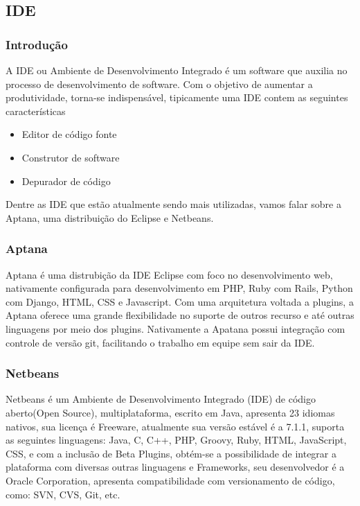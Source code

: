 \documentclass[12pt,a4paper]{article}
\begin{document}
	\subsection{IDE}
	
		\subsubsection{Introdução}

				A IDE ou Ambiente de Desenvolvimento Integrado é um software que auxilia no
				processo de desenvolvimento de software. Com o objetivo de aumentar a
				produtividade, torna-se indispensável, tipicamente uma IDE contem as
				seguintes características
				\begin{itemize}
					\item Editor de código fonte
					\item Construtor de software
					\item Depurador de código
				\end{itemize}
				
				Dentre as IDE que estão atualmente sendo mais utilizadas, vamos falar sobre
				a Aptana, uma distribuição do Eclipse e Netbeans.
		
		\subsubsection{Aptana}
		
			Aptana é uma distrubição da IDE Eclipse com foco no desenvolvimento web, nativamente configurada para
			desenvolvimento em PHP, Ruby com Rails, Python com Django, HTML, CSS e Javascript. Com uma arquitetura voltada a
			plugins, a Aptana oferece uma grande flexibilidade no suporte de outros recurso e até outras linguagens por meio dos
			plugins. Nativamente a Apatana possui integração com controle de versão git, facilitando o trabalho em equipe sem
			sair da IDE.
		
		\subsubsection{Netbeans}
		
			Netbeans é um Ambiente de Desenvolvimento Integrado (IDE) de código aberto(Open Source), multiplataforma, escrito em
			Java, apresenta 23 idiomas nativos, sua licença é Freeware, atualmente sua versão estável é a 7.1.1, suporta as
			seguintes linguagens: Java, C, C++, PHP, Groovy, Ruby, HTML, JavaScript, CSS, e com a inclusão de Beta Plugins,
			obtém-se a possibilidade de integrar a plataforma com diversas outras linguagens e Frameworks, seu desenvolvedor é a
			Oracle Corporation, apresenta compatibilidade com versionamento de código, como: SVN, CVS, Git, etc.
		
\end{document}
